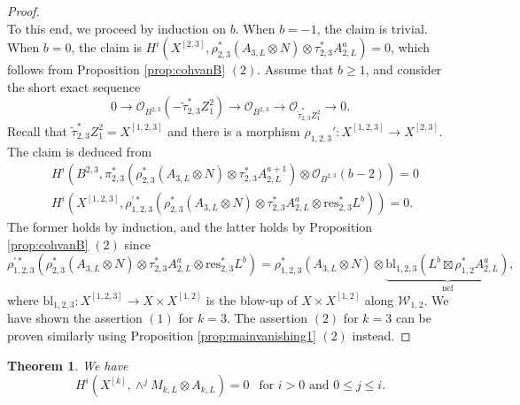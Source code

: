 \documentclass{amsart}
\theoremstyle{plain}
\newtheorem{thm}{Theorem}[section]
\theoremstyle{definition}
\theoremstyle{remark}
\newcommand{\res}{\textrm{res}}
\newcommand{\bl}{\textrm{bl}}
\begin{document}
\begin{proof}
$$$$
To this end, we proceed by induction on $b$. When $b=-1$, the claim is trivial. When $b=0$, the claim is $H^i(X^{[2,3]}, \rho_{2,3}^*(A_{3,L} \otimes N) \otimes \tau_{2,3}^* A_{2,L}^a)=0$, which follows from Proposition \ref{prop:cohvanB} $(2)$. Assume that $b \geq 1$, and consider the short exact sequence
$$
0 \longrightarrow \mathcal{O}_{B^{2,3}}(-\widetilde{\tau}_{2,3}^* Z_1^2) \longrightarrow \mathcal{O}_{B^{2,3}} \longrightarrow \mathcal{O}_{\widetilde{\tau}_{2,3}^* Z_1^2} \longrightarrow 0. 
$$
Recall that $\widetilde{\tau}_{2,3}^* Z_1^2 = X^{[1,2,3]}$ and there is a  morphism $\rho_{1,2,3}' \colon X^{[1,2,3]} \to X^{[2,3]}$. The claim is deduced from 
\begin{align*}
&H^i(B^{2,3}, \pi_{2,3}^* (\rho_{2,3}^*(A_{3,L} \otimes N) \otimes \tau_{2,3}^* A_{2,L}^{a+1}) \otimes \mathcal{O}_{B^{2,3}}(b-2))=0\\
& H^i(X^{[1,2,3]}, \rho^{\prime *}_{1,2,3} (\rho_{2,3}^* (A_{3,L} \otimes N) \otimes \tau_{2,3}^* A_{2,L}^a \otimes \res_{2,3}^* L^b) )=0.
\end{align*}
The former holds by induction, and the latter holds by Proposition \ref{prop:cohvanB} $(2)$ since
$$
\rho^{\prime *}_{1,2,3}(\rho_{2,3}^* (A_{3,L} \otimes N) \otimes \tau_{2,3}^* A_{2,L}^a \otimes \res_{2,3}^* L^b)
= \rho_{1,2,3}^* (A_{3, L} \otimes N) \otimes \underbrace{\bl_{1,2,3} (L^b \boxtimes \rho_{1,2}^* A_{2,L}^a)}_{\text{nef}},
$$
where $\bl_{1,2,3} \colon X^{[1,2,3]} \to X \times X^{[1,2]}$ is the blow-up of $X \times X^{[1,2]}$ along $\mathcal{W}_{1,2}$. We have shown the assertion $(1)$ for $k=3$. The assertion $(2)$ for $k=3$ can be proven similarly using Proposition \ref{prop:mainvanishing1} $(2)$ instead. 
\end{proof}

\begin{thm}\label{thm:maincohvan1}
We have
$$
H^i(X^{[k]}, \wedge^j M_{k,L} \otimes A_{k,L})=0~~\text{ for $i>0$ and $0 \leq j \leq i$}.
$$
\end{thm}
\end{document}
